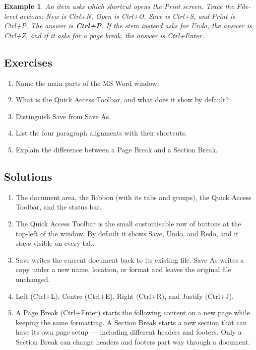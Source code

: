 \documentclass[11pt]{article}
\newtheorem{example}{Example}[section]
\begin{document}
\begin{example}
An item asks which shortcut opens the Print screen. Trace the File-level
actions: New is Ctrl+N, Open is Ctrl+O, Save is Ctrl+S, and Print is
Ctrl+P. The answer is \textbf{Ctrl+P}. If the stem instead asks for Undo, the
answer is Ctrl+Z, and if it asks for a page break, the answer is Ctrl+Enter.
\end{example}

\subsection*{Exercises}
\begin{enumerate}[label=\arabic*.]
  \item Name the main parts of the MS Word window.
  \item What is the Quick Access Toolbar, and what does it show by default?
  \item Distinguish Save from Save As.
  \item List the four paragraph alignments with their shortcuts.
  \item Explain the difference between a Page Break and a Section Break.
\end{enumerate}

\subsection*{Solutions}
\begingroup\small
\begin{enumerate}[label=\arabic*.]
  \item The document area, the Ribbon (with its tabs and groups), the Quick
    Access Toolbar, and the status bar.
  \item The Quick Access Toolbar is the small customisable row of buttons at
    the top-left of the window. By default it shows Save, Undo, and Redo,
    and it stays visible on every tab.
  \item Save writes the current document back to its existing file. Save As
    writes a copy under a new name, location, or format and leaves the
    original file unchanged.
  \item Left (Ctrl+L), Centre (Ctrl+E), Right (Ctrl+R), and Justify
    (Ctrl+J).
  \item A Page Break (Ctrl+Enter) starts the following content on a new page
    while keeping the same formatting. A Section Break starts a new section
    that can have its own page setup --- including different headers and
    footers. Only a Section Break can change headers and footers part way
    through a document.
\end{enumerate}
\endgroup
\end{document}
